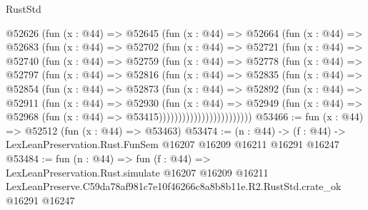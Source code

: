 \begin{lexlean}{RustStd}
\begin{coremodule}
            @52626
              (fun (x : @44) =>
              @52645
                (fun (x : @44) =>
                @52664
                  (fun (x : @44) =>
                  @52683
                    (fun (x : @44) =>
                    @52702
                      (fun (x : @44) =>
                      @52721
                        (fun (x : @44) =>
                        @52740
                          (fun (x : @44) =>
                          @52759
                            (fun (x : @44) =>
                            @52778
                              (fun (x : @44) =>
                              @52797
                                (fun (x : @44) =>
                                @52816
                                  (fun (x : @44) =>
                                  @52835
                                    (fun (x : @44) =>
                                    @52854
                                      (fun (x : @44) =>
                                      @52873
                                        (fun (x : @44) =>
                                        @52892
                                          (fun (x : @44) =>
                                          @52911
                                            (fun (x : @44) =>
                                            @52930
                                              (fun (x : @44) =>
                                              @52949
                                                (fun (x : @44) =>
                                                @52968
                                                  (fun (x : @44) => @53415))))))))))))))))))))))))
@53466 := fun (x : @44) => @52512 (fun (x : @44) => @53463)
@53474 := (n : @44) ->
  (f : @44) -> LexLeanPreservation.Rust.FunSem @16207 @16209 @16211 @16291 @16247
@53484 := fun (n : @44) =>
  fun (f : @44) =>
  LexLeanPreservation.Rust.simulate
    @16207
    @16209
    @16211
    LexLeanPreserve.C59da78af981c7e10f46266c8a8b8b11e.R2.RustStd.crate_ok
    @16291
    @16247
\end{coremodule}
\end{lexlean}
